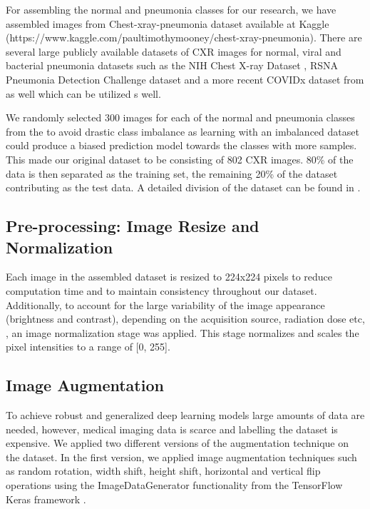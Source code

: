  For assembling the normal and pneumonia classes for our research, we have assembled images from Chest-xray-pneumonia dataset available at Kaggle
 ({https://www.kaggle.com/paultimothymooney/chest-xray-pneumonia}). There are several large publicly available datasets of CXR images for normal, viral and bacterial pneumonia datasets such as the NIH Chest X-ray Dataset \cite{jaeger2014two}, RSNA Pneumonia Detection Challenge dataset and a more recent COVIDx dataset from \cite{wang2020covid} as well which can be utilized s well.
 
  We randomly selected 300 images for each of the normal and pneumonia classes from the to avoid drastic class imbalance as learning with an imbalanced dataset could produce a biased prediction model towards the classes with more samples. This made our original dataset to be consisting of 802 CXR images. 80\% of the data is then separated as the training set, the remaining 20\% of the dataset contributing as the test data. A detailed division of the dataset can be found in .
\subsection{Pre-processing: Image Resize and Normalization}

 Each image in the assembled dataset is resized to 224x224 pixels to reduce computation time and to maintain consistency throughout our dataset. Additionally, to account for the large variability of the image appearance (brightness and contrast), depending on the acquisition source, radiation dose etc, \cite{guendel2019multi, stephen2019efficient}, an image normalization stage was applied.
This stage normalizes and scales the pixel intensities to a range of [0, 255]. 

\subsection{Image Augmentation}
To achieve robust and generalized deep learning models large amounts of data are needed, however, medical imaging data is scarce and labelling the dataset is expensive. We applied two different versions of the augmentation technique on the dataset. In the first version, we applied image augmentation techniques \cite{shorten2019survey} such as random rotation, width shift, height shift, horizontal and vertical flip operations using the ImageDataGenerator functionality from the TensorFlow Keras framework \cite{chollet2018introduction, gulli2017deep}. 

